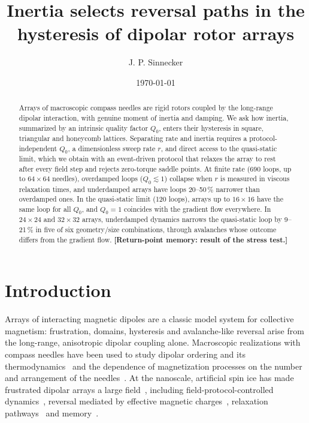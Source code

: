 \documentclass[pre,twocolumn,superscriptaddress,showpacs,floatfix]{revtex4-2}
\newcommand{\todo}[1]{\textcolor{red!70!black}{\textbf{[#1]}}}
\begin{document}
\title{Inertia selects reversal paths in the hysteresis of dipolar rotor arrays}

\author{J. P. Sinnecker}

\date{\today}

\begin{abstract}
Arrays of macroscopic compass needles are rigid rotors coupled by the long-range dipolar interaction, with genuine moment of inertia and damping. We ask how inertia, summarized by an intrinsic quality factor $Q_0$, enters their hysteresis in square, triangular and honeycomb lattices. Separating rate and inertia requires a protocol-independent $Q_0$, a dimensionless sweep rate $r$, and direct access to the quasi-static limit, which we obtain with an event-driven protocol that relaxes the array to rest after every field step and rejects zero-torque saddle points. At finite rate (690 loops, up to $64\times64$ needles), overdamped loops ($Q_0\lesssim1$) collapse when $r$ is measured in viscous relaxation times, and underdamped arrays have loops 20--50\,\% narrower than overdamped ones. In the quasi-static limit (120 loops), arrays up to $16\times16$ have the same loop for all $Q_0$, and $Q_0=1$ coincides with the gradient flow everywhere. In $24\times24$ and $32\times32$ arrays, underdamped dynamics narrows the quasi-static loop by 9--21\,\% in five of six geometry/size combinations, through avalanches whose outcome differs from the gradient flow. \todo{Return-point memory: result of the stress test.}
\end{abstract}

\maketitle

\section{Introduction}
\label{sec:intro}

Arrays of interacting magnetic dipoles are a classic model system for collective magnetism: frustration, domains, hysteresis and avalanche-like reversal arise from the long-range, anisotropic dipolar coupling alone. Macroscopic realizations with compass needles have been used to study dipolar ordering and its thermodynamics~\cite{olive1998} and the dependence of magnetization processes on the number and arrangement of the needles~\cite{novak2004}. At the nanoscale, artificial spin ice has made frustrated dipolar arrays a large field~\cite{nisoli2013,skjaervoe2020}, including field-protocol-controlled dynamics~\cite{jensen2024}, reversal mediated by effective magnetic charges~\cite{mellado2010}, relaxation pathways~\cite{menniti2025} and memory~\cite{taniguchi2025}.
\end{document}
